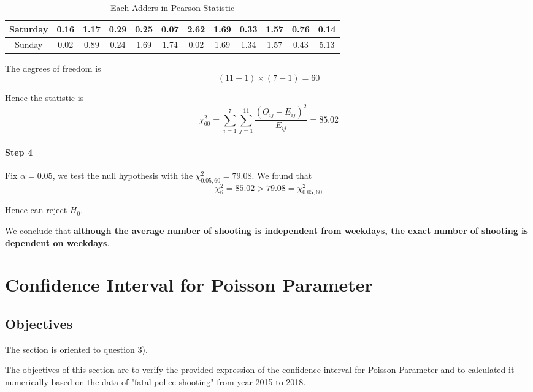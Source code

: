 \documentclass[a4paper]{article}
\begin{document}
\begin{table}[!htbp]
\begin{tabular}{|c|c|c|c|c|c|c|c|c|c|c|c|}
    \hline
    \rowcolor[rgb]{ .867,  .922,  .969} Saturday & \cellcolor[rgb]{ 1,  1,  1}0.16  & \cellcolor[rgb]{ 1,  1,  1}1.17  & \cellcolor[rgb]{ 1,  1,  1}0.29  & \cellcolor[rgb]{ 1,  1,  1}0.25  & \cellcolor[rgb]{ 1,  1,  1}0.07  & \cellcolor[rgb]{ 1,  1,  1}2.62  & \cellcolor[rgb]{ 1,  1,  1}1.69  & \cellcolor[rgb]{ 1,  1,  1}0.33  & \cellcolor[rgb]{ 1,  1,  1}1.57  & \cellcolor[rgb]{ 1,  1,  1}0.76  & \cellcolor[rgb]{ 1,  1,  1}0.14  \\
    \hline
    \rowcolor[rgb]{ .867,  .922,  .969} Sunday & \cellcolor[rgb]{ 1,  1,  1}0.02  & \cellcolor[rgb]{ 1,  1,  1}0.89  & \cellcolor[rgb]{ 1,  1,  1}0.24  & \cellcolor[rgb]{ 1,  1,  1}1.69  & \cellcolor[rgb]{ 1,  1,  1}1.74  & \cellcolor[rgb]{ 1,  1,  1}0.02  & \cellcolor[rgb]{ 1,  1,  1}1.69  & \cellcolor[rgb]{ 1,  1,  1}1.34  & \cellcolor[rgb]{ 1,  1,  1}1.57  & \cellcolor[rgb]{ 1,  1,  1}0.43  & \cellcolor[rgb]{ 1,  1,  1}5.13  \\
    \hline
    \end{tabular}%
  \caption{Each Adders in Pearson Statistic}
\end{table}%

The degrees of freedom is 
$$(11-1)\times(7-1)=60$$

Hence the statistic is
$$\chi_{60}^2=\sum^{7}_{i=1} \sum^{11}_{j=1} \frac { \left( O _ { ij } - E _ { ij } \right) ^{ 2 } } { E _ { ij } } = 85.02$$

\paragraph{Step 4}Fix $\alpha=0.05$, we test the null hypothesis with the $\chi^2_{0.05,60}=79.08$. We found that
$$\chi_{6}^2 = 85.02>79.08=\chi^2_{0.05,60}$$

Hence can reject $H_0$.

We conclude that \textbf{although the average number of shooting is independent from weekdays, the exact number of shooting is dependent on weekdays}.
\section{Confidence Interval for Poisson Parameter}
\subsection{Objectives}

The section is oriented to question 3).

The objectives of this section are to verify the provided expression of the confidence interval for Poisson Parameter and to calculated it numerically based on the data of "fatal police shooting" from year 2015 to 2018.
\end{document}
